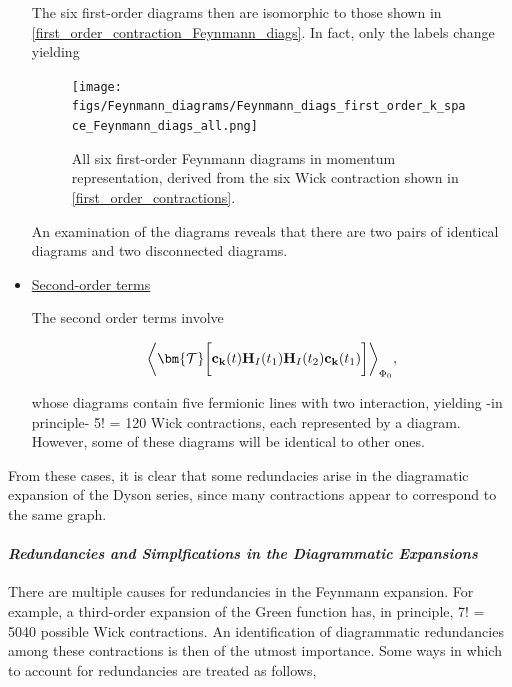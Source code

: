 \begin{itemize}
The six first-order diagrams then are isomorphic to those shown in \cref{first_order_contraction_Feynmann_diags}. 
In fact, only the labels change yielding 

\begin{figure}[H]
    \centering
    \texttt{[image: figs/Feynmann\_diagrams/Feynmann\_diags\_first\_order\_k\_space\_Feynmann\_diags\_all.png]}
    \caption{All six first-order Feynmann diagrams in momentum representation, derived from the six Wick contraction shown in \cref{first_order_contractions}.}
\end{figure}

An examination of the diagrams reveals that there are two pairs of identical diagrams and two disconnected diagrams. \\

\item \underline{Second-order terms}

The second order terms involve 

\begin{equation}
    \bigg \langle \bm{\mathcal{T}} \bigg[ {\bf c}_{{\bf k}}(t) {\bf H}_I(t_1){\bf H}_I(t_2) {\bf c}_{{\bf k}}(t_1)
    \bigg]\bigg \rangle_{{\Phi_0}},
\end{equation}

whose diagrams contain five fermionic lines with two interaction, yielding -in principle- 5! = 120 Wick contractions, each represented by a diagram. However, some of these diagrams will be identical to other ones. \\

\end{itemize}

From these cases, it is clear that some redundacies arise in the diagramatic expansion of the Dyson series, since many contractions appear to correspond to the same graph. \\

\paragraph{\textit{Redundancies and Simplfications in the Diagrammatic Expansions}}

There are multiple causes for redundancies in the Feynmann expansion. For example, a third-order expansion of the Green function has, in principle, 7! = 5040 possible Wick contractions. An identification of diagrammatic redundancies among these contractions is then of the utmost importance. Some ways in which to account for redundancies are treated as follows,

